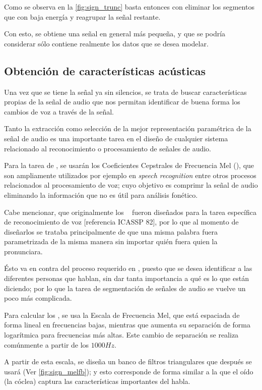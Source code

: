 Como se observa en la \autoref{fig:sign_trunc} basta entonces con eliminar los segmentos que con baja energía y reagrupar la señal restante.

Con esto, se obtiene una señal en general más pequeña, y que se podría  considerar sólo contiene realmente los datos que se desea modelar.

\subsection{Obtención de características acústicas}

Una vez que se tiene la señal ya sin silencios, se trata de buscar características propias de la señal de audio que nos permitan identificar de buena forma los cambios de voz a través de la señal.

Tanto la extracción como selección de la mejor representación paramétrica de la señal de audio es una importante tarea en el diseño de cualquier sistema relacionado al reconocimiento o procesamiento de señales de audio. 

Para la tarea de \sd, se usarán los Coeficientes Cepstrales de Frecuencia Mel  (\MFCC), que son ampliamente utilizados por ejemplo en \textit{speech recognition} entre otros procesos relacionados al procesamiento de voz; cuyo objetivo es comprimr la señal de audio eliminando la información que no es útil para análisis fonético.

Cabe mencionar, que originalmente los \MFCC~ fueron diseñados para la tarea específica de reconocimiento de voz [referencia ICASSP 82], por lo que al momento de diseñarlos se trataba principalmente de que una misma palabra  fuera parametrizada de la misma manera sin importar quién fuera quien la pronunciara. 

Ésto va en contra del proceso requerido en \sd, puesto que se desea identificar a las diferentes personas que hablan, sin dar tanta importancia a qué es lo que están diciendo; por lo que la tarea de segmentación de señales de audio se vuelve un poco más complicada.

Para calcular los \MFCC, se usa la Escala de Frecuencia Mel, que está espaciada de forma lineal en frecuencias bajas, mientras que aumenta su separación de forma logarítmica para frecuencias más altas. Este cambio de separación se realiza comúnmente a partir de los $1000Hz$. 

A partir de esta escala, se diseña un banco de filtros triangulares que después se usará (Ver \autoref{fig:sign_melfb}); y esto corresponde de forma similar a la que el oído (la cóclea) captura las características importantes del habla. 

